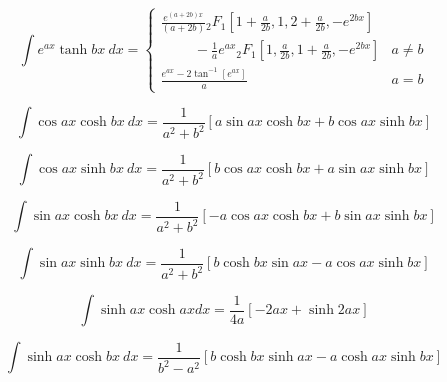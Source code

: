 \documentclass[12pt,letterpaper,leqno]{article}
\begin{document}
\begin{equation}\label{eq:dewitt}
\int  e^{ax} \tanh bx\ dx = 
\begin{cases}
\displaystyle{ \frac{ e^{(a+2b)x}}{(a+2b)} 
{_2F_1}\left[ 1+\frac{a}{2b},1,2+\frac{a}{2b}, -e^{2bx}\right] }& \\
\displaystyle{
\hspace{1cm}-\frac{1}{a}e^{ax}{_2F_1}\left[ 1, \frac{a}{2b},1+\frac{a}{2b}, -e^{2bx}\right]
}
 & a\ne b \\
\displaystyle{\frac{e^{ax}-2\tan^{-1}[e^{ax}]}{a} } & a = b
\end{cases}
\end{equation}



\begin{equation}
\int \cos ax \cosh bx\ dx = 
\frac{1}{a^2 + b^2} \left[
a \sin ax \cosh bx  + b \cos ax \sinh bx
\right] 
\end{equation}

\begin{equation}
\int \cos ax \sinh bx\ dx = 
\frac{1}{a^2 + b^2} \left[
b \cos ax \cosh bx +
 a \sin ax \sinh bx
\right] 
\end{equation}

\begin{equation}
\int \sin ax \cosh bx \ dx = 
\frac{1}{a^2 + b^2} \left[
-a \cos ax \cosh bx +
 b \sin ax \sinh bx
\right] 
\end{equation}

\begin{equation}
\int \sin ax \sinh bx \ dx = 
\frac{1}{a^2 + b^2} \left[
b \cosh bx \sin ax -
 a \cos ax \sinh bx
\right] 
\end{equation}

\begin{equation}
\int \sinh ax \cosh ax dx= 
\frac{1}{4a}\left[ 
-2ax + \sinh 2ax \right]
\end{equation}

\begin{equation}
\int \sinh ax \cosh bx \ dx = 
\frac{1}{b^2-a^2}\left[ 
b \cosh bx \sinh ax 
- a \cosh ax \sinh bx \right]
\end{equation}
\end{document}
